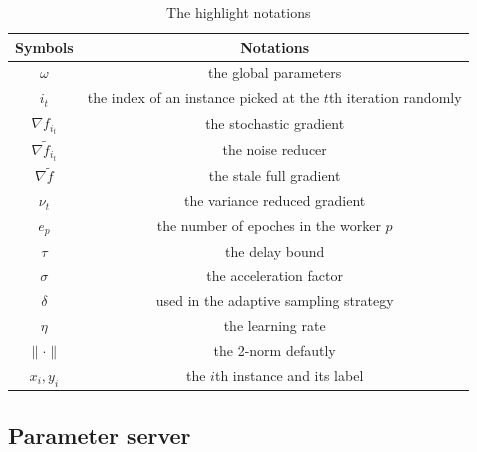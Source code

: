 \documentclass[preprint,review,11pt,a4paper]{elsarticle}
\begin{document}
\begin{table}[!t]

\centering
\scriptsize
\caption{The highlight notations} \label{table_symbols}
\begin{tabular}{|c|c|}
\hline 
Symbols & Notations\tabularnewline
\hline 
$\omega$ & the global parameters\tabularnewline
\hline 
$i_{t}$ & the index of an instance picked at the $t$th iteration randomly\tabularnewline
\hline 
$\nabla f_{i_{t}}$ & the stochastic gradient\tabularnewline
\hline 
$\nabla \tilde{f}_{i_t}$ & the noise reducer\tabularnewline
\hline 
$\nabla \tilde{f}$ & the stale full gradient\tabularnewline
\hline 
$\nu_t$ & the variance reduced gradient\tabularnewline
\hline 
$e_p$ & the number of epoches in the worker $p$\tabularnewline
\hline 
$\tau$ & the delay bound\tabularnewline
\hline 
$\sigma$ & the acceleration factor\tabularnewline
\hline 
$\delta$ & used in the adaptive sampling strategy \tabularnewline
\hline 
$\eta$ & the learning rate\tabularnewline
\hline 
$\parallel \cdot \parallel$ & the 2-norm defautly\tabularnewline
\hline 
$x_i, y_i$ & the $i$th instance and its label\tabularnewline
\hline 
\end{tabular}
\end{table}



\subsection{Parameter server}
\label{parameter server}
\end{document}
